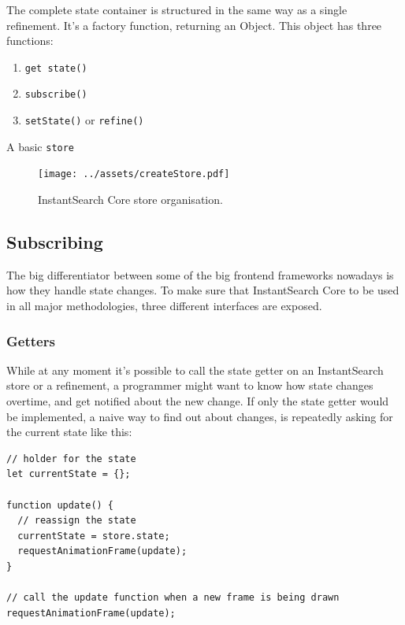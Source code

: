 The complete state container is structured in the same way as a single refinement. It's a factory function, returning an Object. This object has three functions: 

\begin{enumerate}
  \item {\tt get state()}
  \item {\tt subscribe()}
  \item {\tt setState()} or {\tt refine()}
\end{enumerate}

A basic {\tt store}

\begin{figure}[H]
\label{figure:createstore_inheritance}
  \centering
  \texttt{[image: ../assets/createStore.pdf]}
  \caption{InstantSearch Core store organisation.}
\end{figure}

\subsection{Subscribing}
\label{ssec:Subscribing}

The big differentiator between some of the big frontend frameworks nowadays is how they handle state changes. To make sure that InstantSearch Core to be used in all major methodologies, three different interfaces are exposed.

\subsubsection{Getters}
\label{ssub:getters}

While at any moment it's possible to call the state getter on an InstantSearch store or a refinement, a programmer might want to know how state changes overtime, and get notified about the new change. If only the state getter would be implemented, a naive way to find out about changes, is repeatedly asking for the current state like this:

\begin{lstlisting}[caption={Naive way to find out about changed state},label={lst:is-core-naive-subscribe}]
// holder for the state
let currentState = {};

function update() {
  // reassign the state
  currentState = store.state;
  requestAnimationFrame(update);
}

// call the update function when a new frame is being drawn
requestAnimationFrame(update);
\end{lstlisting}

